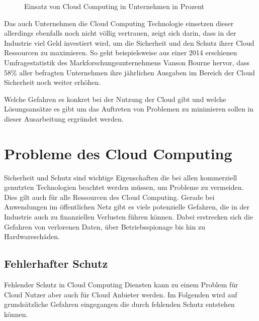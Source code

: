 \begin{figure}[t]
{
	}
	\caption{Einsatz von Cloud Computing in Unternehmen in Prozent \cite{heidkamp2020}}
	\label{tab:cloudanstieg}
\end{figure}


Das auch Unternehmen die Cloud Computing Technologie einsetzen dieser allerdings ebenfalls noch nicht völlig vertrauen, zeigt sich darin, dass in der Industrie viel Geld investiert wird, um die Sicherheit und den Schutz ihrer Cloud Ressourcen zu maximieren. So geht beispielsweise aus einer 2014 erschienen Umfragestatistik des Markforschungsunternehmens Vanson Bourne \cite{vansonbourne2014} hervor, dass 58\% aller befragten Unternehmen ihre jährlichen Ausgaben im Bereich der Cloud Sicherheit noch weiter erhöhen.

Welche Gefahren es konkret bei der Nutzung der Cloud gibt und welche Lösungsansätze es gibt um das Auftreten von Problemen zu minimieren sollen in dieser Ausarbeitung ergründet werden.

\section{Probleme des Cloud Computing}
Sicherheit und Schutz sind wichtige Eigenschaften die bei allen kommerziell genutzten Technologien beachtet werden müssen, um Probleme zu vermeiden. Dies gilt auch für alle Ressourcen des Cloud Computing. Gerade bei Anwendungen im öffentlichen Netz gibt es viele potenzielle Gefahren, die in der Industrie auch zu finanziellen Verlusten führen können. 
Dabei erstrecken sich die Gefahren von verlorenen Daten, über Betriebsspionage bis hin zu Hardwareschäden. 

\subsection{Fehlerhafter Schutz}
\label{sec:fehlender-Schutz}
Fehlender Schutz in Cloud Computing Diensten kann zu einem Problem für Cloud Nutzer aber auch für Cloud Anbieter werden. Im Folgenden wird auf grundsätzliche Gefahren eingegangen die durch fehlenden Schutz entstehen können.

